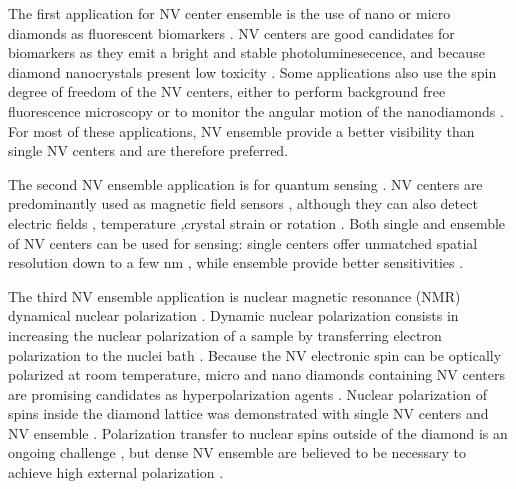 \documentclass[a4paper, 11pt]{report}
\begin{document}
The first application for NV center ensemble is the use of nano or micro diamonds as fluorescent biomarkers \citep{fu2007characterization, mohan2010vivo}. NV centers are good candidates for biomarkers as they emit a bright and stable photoluminesecence, and because diamond nanocrystals present low toxicity \citep{schirhagl2014nitrogen}. Some applications also use the spin degree of freedom of the NV centers, either to perform background free fluorescence microscopy \citep{chapman2013background} or to monitor the angular motion of the nanodiamonds \citep{mcguinness2011quantum, feng2021association}. For most of these applications, NV ensemble provide a better visibility than single NV centers and are therefore preferred.

The second NV ensemble application is for quantum sensing \citep{degen2017quantum}. NV centers are predominantly used as magnetic field sensors \citep{rondin2014magnetometry, barry2020sensitivity}, although they can also detect electric fields \citep{dolde2011electric, michl2019robust}, temperature \citep{acosta2010temperature, kucsko2013nanometre} ,crystal strain \citep{ovartchaiyapong2014dynamic, doherty2014electronic} or rotation \citep{ledbetter2012gyroscopes, ajoy2012stable}. Both single and ensemble of NV centers can be used for sensing: single centers offer unmatched spatial resolution \citep{mitchell2020colloquium} down to a few nm \citep{lovchinsky2016nuclear}, while ensemble provide better sensitivities \citep{wolf2015subpicotesla, barry2020sensitivity}. 

The third NV ensemble application is nuclear magnetic resonance (NMR) dynamical nuclear polarization \citep{eills2022spin}. Dynamic nuclear polarization consists in increasing the nuclear polarization of a sample by transferring electron polarization to the nuclei bath \citep{abragam1978principles}. Because the NV electronic spin can be optically polarized at room temperature, micro and nano diamonds containing NV centers are promising candidates as hyperpolarization agents \citep{tetienne2021prospects}. Nuclear polarization of spins inside the diamond lattice was demonstrated with single NV centers \citep{jacques2009dynamic, smeltzer2009robust} and NV ensemble \citep{king2015room, scheuer2016optically, schwartz2018robust}. Polarization transfer to nuclear spins outside of the diamond is an ongoing challenge \citep{eills2022spin, healey2021polarization}, but dense NV ensemble are believed to be necessary to achieve high external polarization \citep{tetienne2021prospects, rizzato2022polarization}.
\end{document}
